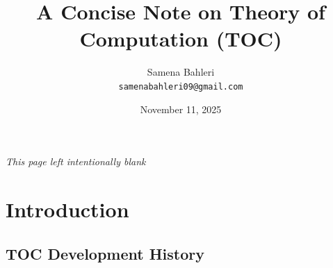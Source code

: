 \documentclass[12pt,a4paper,openany]{article}
\title{A Concise Note on Theory of Computation (TOC)}
\author{Samena Bahleri \\[5pt] \texttt{samenabahleri09@gmail.com}}
\date{November 11, 2025}
\begin{document}
\maketitle

\newpage
\thispagestyle{empty} 
\vspace*{\fill} 
\begin{center}
    \emph{\small This page left intentionally blank}
\end{center}
\vspace*{\fill}

\newpage
\tableofcontents

\newpage
\section{Introduction}

\subsection{TOC Development History}
\end{document}
